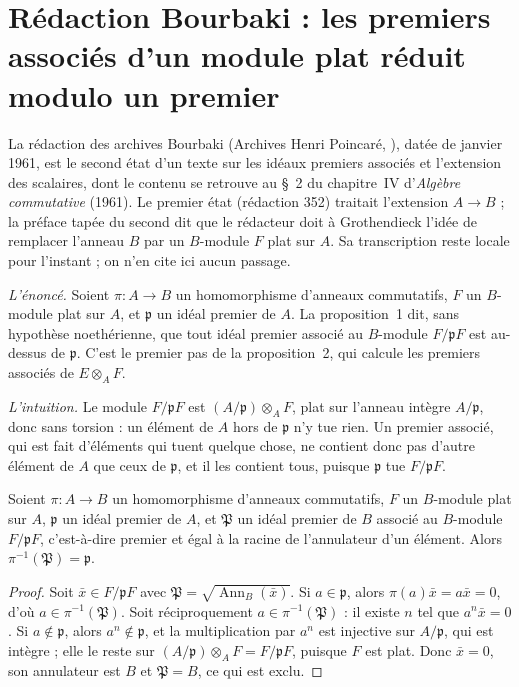 \section[Rédaction Bourbaki \redac{355} : premiers associés et extension plate]{Rédaction Bourbaki  : les premiers associés d'un module plat réduit modulo un premier\protect{}}\label{sec:bourbaki-355}

La rédaction  des archives Bourbaki (Archives Henri Poincaré, ), datée de janvier 1961, est le second état d'un texte sur les idéaux premiers associés et l'extension des scalaires, dont le contenu se retrouve au §~2 du chapitre~IV d'\emph{Algèbre commutative} (1961). Le premier état (rédaction 352) traitait l'extension $A \to B$ ; la préface tapée du second dit que le rédacteur doit à Grothendieck l'idée de remplacer l'anneau $B$ par un $B$-module $F$ plat sur $A$. Sa transcription reste locale pour l'instant ; on n'en cite ici aucun passage.

\emph{L'énoncé.} Soient $\pi : A \to B$ un homomorphisme d'anneaux commutatifs, $F$ un $B$-module plat sur $A$, et $\mathfrak p$ un idéal premier de $A$. La proposition~1 dit, sans hypothèse noethérienne, que tout idéal premier associé au $B$-module $F/\mathfrak pF$ est au-dessus de $\mathfrak p$. C'est le premier pas de la proposition~2, qui calcule les premiers associés de $E \otimes_A F$.

\emph{L'intuition.} Le module $F/\mathfrak pF$ est $(A/\mathfrak p) \otimes_A F$, plat sur l'anneau intègre $A/\mathfrak p$, donc sans torsion : un élément de $A$ hors de $\mathfrak p$ n'y tue rien. Un premier associé, qui est fait d'éléments qui tuent quelque chose, ne contient donc pas d'autre élément de $A$ que ceux de $\mathfrak p$, et il les contient tous, puisque $\mathfrak p$ tue $F/\mathfrak pF$.

\begin{encadre}
\begin{enonce}
Soient $\pi : A \to B$ un homomorphisme d'anneaux commutatifs, $F$ un $B$-module plat sur $A$, $\mathfrak p$ un idéal premier de $A$, et $\mathfrak P$ un idéal premier de $B$ associé au $B$-module $F/\mathfrak pF$, c'est-à-dire premier et égal à la racine de l'annulateur d'un élément. Alors $\pi^{-1}(\mathfrak P) = \mathfrak p$.
\end{enonce}
\end{encadre}

\begin{proof}
Soit $\bar x \in F/\mathfrak pF$ avec $\mathfrak P = \sqrt{\operatorname{Ann}_B(\bar x)}$. Si $a \in \mathfrak p$, alors $\pi(a)\bar x = a\bar x = 0$, d'où $a \in \pi^{-1}(\mathfrak P)$. Soit réciproquement $a \in \pi^{-1}(\mathfrak P)$ : il existe $n$ tel que $a^n \bar x = 0$. Si $a \notin \mathfrak p$, alors $a^n \notin \mathfrak p$, et la multiplication par $a^n$ est injective sur $A/\mathfrak p$, qui est intègre ; elle le reste sur $(A/\mathfrak p) \otimes_A F = F/\mathfrak pF$, puisque $F$ est plat. Donc $\bar x = 0$, son annulateur est $B$ et $\mathfrak P = B$, ce qui est exclu.
\end{proof}

